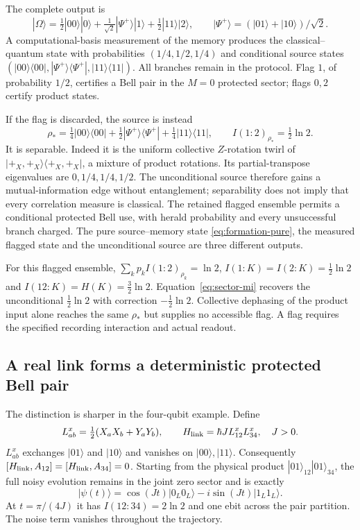 \documentclass[12pt,a4paper]{article}
\newcommand{\ket}[1]{|#1\rangle}
\newcommand{\proj}[1]{|#1\rangle\!\langle #1|}
\begin{document}
The complete output is
\begin{equation}\label{eq:formation-pure}
 \ket{\Omega}
 =\tfrac12\ket{00}\ket0
   +\tfrac1{\sqrt2}\ket{\Psi^+}\ket1
   +\tfrac12\ket{11}\ket2,\qquad
 \ket{\Psi^+}=(\ket{01}+\ket{10})/\sqrt2 .
\end{equation}
A computational-basis measurement of the memory produces the
classical--quantum state with probabilities $(1/4,1/2,1/4)$ and
conditional source states
$(\proj{00},\proj{\Psi^+},\proj{11})$. All branches remain in the
protocol. Flag $1$, of probability $1/2$, certifies a Bell pair in the
$M=0$ protected sector; flags $0,2$ certify product states.

If the flag is discarded, the source is instead
\begin{equation}\label{eq:formation-unconditional}
 \rho_*=\tfrac14\proj{00}+\tfrac12\proj{\Psi^+}
                 +\tfrac14\proj{11},\qquad I(1:2)_{\rho_*}=\tfrac12\ln2 .
\end{equation}
It is separable. Indeed it is the uniform collective $Z$-rotation
twirl of $\proj{+_X,+_X}$, a mixture of product rotations.
Its partial-transpose eigenvalues are $0,1/4,1/4,1/2$.
The unconditional source therefore gains a mutual-information
edge without entanglement; separability does not imply that every
correlation measure is classical. The retained flagged ensemble permits a
conditional protected Bell use, with herald probability and every
unsuccessful branch charged. The pure source--memory state
\eqref{eq:formation-pure}, the measured flagged state and the
unconditional source are three different outputs.

For this flagged ensemble,
$\sum_kp_k I(1:2)_{\rho_k}=\ln2$,
$I(1:K)=I(2:K)=\frac12\ln2$ and
$I(12:K)=H(K)=\frac32\ln2$.
Equation~\eqref{eq:sector-mi} recovers the unconditional
$\frac12\ln2$ with correction $-\frac12\ln2$.
Collective dephasing of the product input alone reaches the same
$\rho_*$ but supplies no accessible flag. A flag requires the
specified recording interaction and actual readout.

\subsection{A real link forms a deterministic protected Bell pair}

The distinction is sharper in the four-qubit example. Define
\[
 L^x_{ab}=\tfrac12(X_aX_b+Y_aY_b),\qquad
 H_{\rm link}=\hbar J L^x_{12}L^x_{34},\quad J>0 .
\]
$L^x_{ab}$ exchanges $\ket{01}$ and $\ket{10}$ and vanishes on
$\ket{00},\ket{11}$. Consequently
$[H_{\rm link},A_{12}]=[H_{\rm link},A_{34}]=0$.
Starting from the physical product $\ket{01}_{12}\ket{01}_{34}$,
the full noisy evolution remains in the joint zero sector and is
exactly
\begin{equation}\label{eq:formed-logical-bell}
 \ket{\psi(t)}
 =\cos(Jt)\ket{0_L0_L}-i\sin(Jt)\ket{1_L1_L}.
\end{equation}
At $t=\pi/(4J)$ it has $I(12:34)=2\ln2$ and one ebit across
the pair partition. The noise term vanishes throughout the trajectory.
\end{document}
